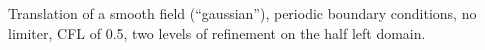 Translation of a smooth field (``gaussian''), periodic boundary conditions, no limiter, CFL of 0.5, two levels of refinement on the half left domain.
